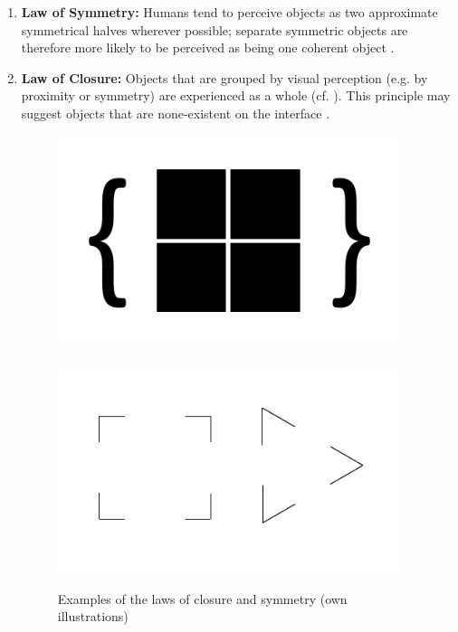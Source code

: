 \begin{enumerate}
    \item \textbf{Law of Symmetry:} Humans tend to perceive objects as two approximate symmetrical halves wherever possible; separate symmetric objects are therefore more likely to be perceived as being one coherent object \parencite[cf.][]{Soegaard.n.y.}.
    
    \item \textbf{Law of Closure:} Objects that are grouped by visual perception (e.g. by proximity or symmetry) are experienced as a whole (cf. ). This principle may suggest objects that are none-existent on the interface \parencite[cf.][]{Stevenson.n.y.}.
    
    \begin{figure}[H] 
        \begin{minipage}[b]{.5\linewidth}
            \centering\includegraphics[width=0.94\textwidth]{img/symmetry.pdf}
            \label{fig:sym}
        \end{minipage}
        \begin{minipage}[b]{.5\linewidth}
            \centering\includegraphics[width=0.94\textwidth]{img/closure.pdf}
            \label{fig:clo}
        \end{minipage}%
        \caption[Laws of Closure and Symmetry]{Examples of the laws of closure and symmetry (own illustrations)}\label{fig:law2}
    \end{figure}
    

\end{enumerate}
